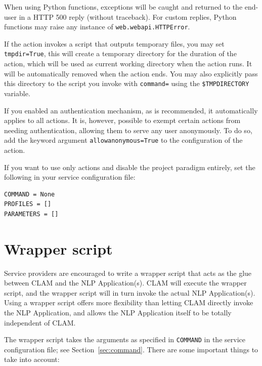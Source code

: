 \documentclass[a4paper,12pt,twoside,openright]{report}
\begin{document}
When using Python functions, exceptions will be caught and returned to the
end-user in a HTTP 500 reply (without traceback). For custom replies, Python
functions may raise any instance of \texttt{web.webapi.HTTPError}.

If the action invokes a script that outputs temporary files, you may set
\texttt{tmpdir=True}, this will create a temporary directory for the duration
of the action, which will be used as current working directory when the action
runs. It will be automatically removed when the action ends. You may also
explicitly pass this directory to the script you invoke with \texttt{command=} using the
\texttt{\$TMPDIRECTORY} variable.

If you enabled an authentication mechanism, as is recommended, it automatically
applies to all actions. It is, however, possible to exempt certain actions from
needing authentication, allowing them to serve any user anonymously. To do so, add
the keyword argument \texttt{allowanonymous=True} to the configuration of the
action. 

If you want to use only actions and disable the project paradigm
entirely, set the following in your service configuration file:

{ \small
\begin{verbatim}
COMMAND = None
PROFILES = []
PARAMETERS = []
\end{verbatim}
}


\section{Wrapper script}

Service providers are encouraged to write a wrapper script that acts as the
glue between CLAM and the NLP Application(s). CLAM will execute the wrapper
script, and the wrapper script will in turn invoke the actual NLP
Application(s). Using a wrapper script offers more flexibility than letting
CLAM directly invoke the NLP Application, and allows the NLP Application itself
to be totally independent of CLAM. 

The wrapper script takes the arguments as specified in \texttt{COMMAND} in the
service configuration file; see Section~\ref{sec:command}. There are some
important things to take into account:
\end{document}
